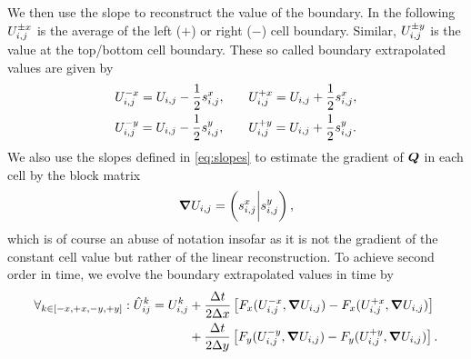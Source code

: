 We then use the slope to reconstruct the value of the boundary.
In the following $U_{i,j}^{\pm x}$ is the average of the left ($+$) or right ($-$) cell boundary.
Similar, $U_{i,j}^{\pm y}$ is the value at the top/bottom cell boundary.
These so called boundary extrapolated values are given by
\newcommand{\extrapolatedCellAvg}[3][i,j]{\cellAvg[#1]^{#3 #2} = \cellAvg #3 \frac{1}{2} \slope{#2}}
\begin{equation}
\begin{alignedat}{2}
& \extrapolatedCellAvg{x}{-} , \qquad && \extrapolatedCellAvg{x}{+}, \\
& \extrapolatedCellAvg{y}{-} , \qquad && \extrapolatedCellAvg{y}{+}.
\end{alignedat}
\end{equation}
We also use the slopes defined in \cref{eq:slopes} to estimate the gradient of $\bm{Q}$ in each cell by the block matrix
\begin{equation}
  \label{eq:muscl-gradient}
  \gradCellAvg = \left( \slope{x} \bigg\rvert \slope{y} \right),
\end{equation}
which is of course an abuse of notation insofar as it is not the gradient of the constant cell value but rather of the linear reconstruction.
To achieve second order in time, we evolve the boundary extrapolated values in time by
\newcommand{\evolvedCellAvg}[2][i,j]{\hat{U}_{#1}^{#2}}
\begin{equation}\label{eq:muscl-time-evolution}
  \begin{split}
  \forall_{k \in [-x, +x, -y, +y]}:  \hat{U}_{ij}^k = \cellAvg^k &+
  \frac{\Delta t}{2 \Delta x} \left[ \fluxX(\cellAvg^{-x}, \gradCellAvg) - \fluxX(\cellAvg^{+x}, \gradCellAvg) \right] \\&+
  \frac{\Delta t}{2 \Delta y} \left[ \fluxY(\cellAvg^{-y}, \gradCellAvg) - \fluxY(\cellAvg^{+y}, \gradCellAvg) \right].
  \end{split}
\end{equation}

